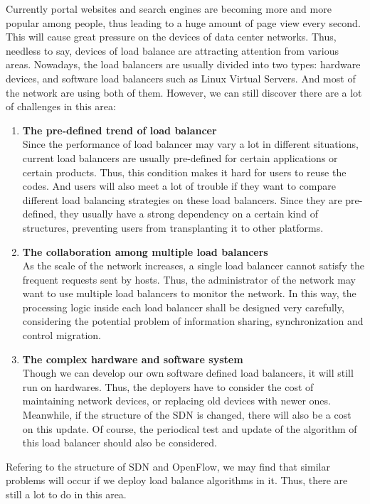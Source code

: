 Currently portal websites and search engines are becoming more and more popular among people, thus leading to a huge amount of page view every second. This will cause great pressure on the devices of data center networks. Thus, needless to say, devices of load balance are attracting attention from various areas. Nowadays, the load balancers are usually divided into two types: hardware devices, and software load balancers such as Linux Virtual Servers. And most of the network are using both of them. However, we can still discover there are a lot of challenges in this area:

\begin{enumerate}
\item \textbf{The pre-defined trend of load balancer}\\
Since the performance of load balancer may vary a lot in different situations, current load balancers are usually pre-defined for certain applications or certain products. Thus, this condition makes it hard for users to reuse the codes. And users will also meet a lot of trouble if they want to compare different load balancing strategies on these load balancers. Since they are pre-defined, they usually have a strong dependency on a certain kind of structures, preventing users from transplanting it to other platforms.
\item \textbf{The collaboration among multiple load balancers}\\
As the scale of the network increases, a single load balancer cannot satisfy the frequent requests sent by hosts. Thus, the administrator of the network may want to use multiple load balancers to monitor the network. In this way, the processing logic inside each load balancer shall be designed very carefully, considering the potential problem of information sharing, synchronization and control migration.
\item \textbf{The complex hardware and software system}\\
Though we can develop our own software defined load balancers, it will still run on hardwares. Thus, the deployers have to consider the cost of maintaining network devices, or replacing old devices with newer ones. Meanwhile, if the structure of the SDN is changed, there will also be a cost on this update. Of course, the periodical test and update of the algorithm of this load balancer should also be considered.
\end{enumerate}

Refering to the structure of SDN and OpenFlow, we may find that similar problems will occur if we deploy load balance algorithms in it. Thus, there are still a lot to do in this area.

